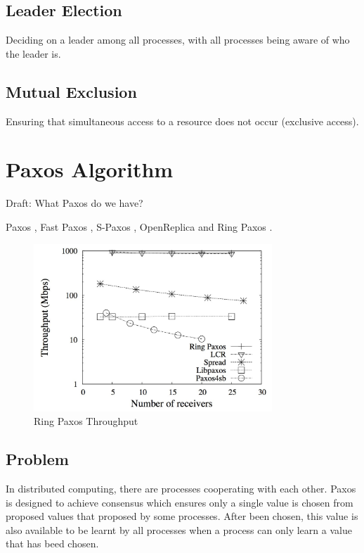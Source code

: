 \documentclass[12pt, a4paper]{article}
\begin{document}
\subsection{Leader Election}

Deciding on a leader among all processes, with all processes being aware of
who the leader is.

\subsection{Mutual Exclusion}

Ensuring that simultaneous access to a resource does not occur (exclusive
access).


\section{Paxos Algorithm} \label{sec:paxos}

Draft: What Paxos do we have?

Paxos \cite{lamport2001paxos}, Fast Paxos \cite{fastpaxos}, 
S-Paxos \cite{spaxos}, 
OpenReplica \cite{openreplica} and Ring Paxos \cite{ringpaxos}.

\begin{figure}[htp]
  \centering
  \includegraphics[width=0.8\textwidth]{img/RingPaxosThroughput.jpg}
  \caption{Ring Paxos Throughput}
  \label{fig:RingPaxosThroughput}
\end{figure}


\subsection{Problem}
In distributed computing, there are processes cooperating with each other. 
Paxos is designed to achieve consensus which ensures 
only a single value is chosen from proposed values that 
proposed by some processes\cite{fischer1983consensus}. 
After been chosen, this value is also available to be learnt by all processes
when a process can only learn a value that has beed chosen.
\end{document}
